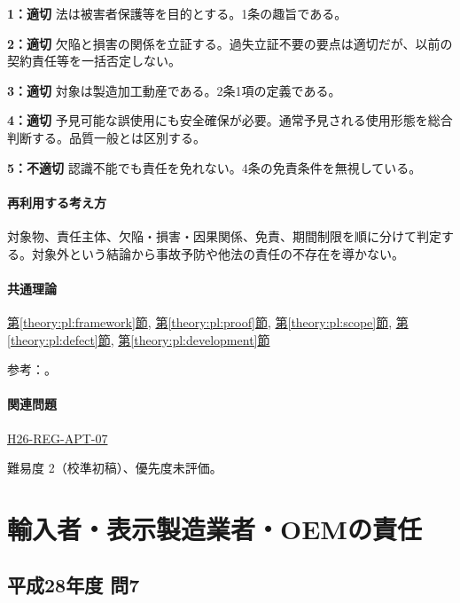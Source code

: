 \noindent\textbf{1：適切} 法は被害者保護等を目的とする。1条の趣旨である。\par

\noindent\textbf{2：適切} 欠陥と損害の関係を立証する。過失立証不要の要点は適切だが、以前の契約責任等を一括否定しない。\par

\noindent\textbf{3：適切} 対象は製造加工動産である。2条1項の定義である。\par

\noindent\textbf{4：適切} 予見可能な誤使用にも安全確保が必要。通常予見される使用形態を総合判断する。品質一般とは区別する。\par

\noindent\textbf{5：不適切} 認識不能でも責任を免れない。4条の免責条件を無視している。\par

\paragraph{再利用する考え方} 対象物、責任主体、欠陥・損害・因果関係、免責、期間制限を順に分けて判定する。対象外という結論から事故予防や他法の責任の不存在を導かない。

\paragraph{共通理論} \hyperref[theory:pl:framework]{第\ref*{theory:pl:framework}節}, \hyperref[theory:pl:proof]{第\ref*{theory:pl:proof}節}, \hyperref[theory:pl:scope]{第\ref*{theory:pl:scope}節}, \hyperref[theory:pl:defect]{第\ref*{theory:pl:defect}節}, \hyperref[theory:pl:development]{第\ref*{theory:pl:development}節}

\par 参考：\cite{pl_statute,pl_qa,pl_definitions2018}。

\paragraph{関連問題} \hyperref[q:h26-reg-apt-07]{H26-REG-APT-07}

\par 難易度 2（校準初稿）、優先度未評価。

\section{輸入者・表示製造業者・OEMの責任}

\subsection{平成28年度 問7}
\label{q:h28-reg-apt-07}

